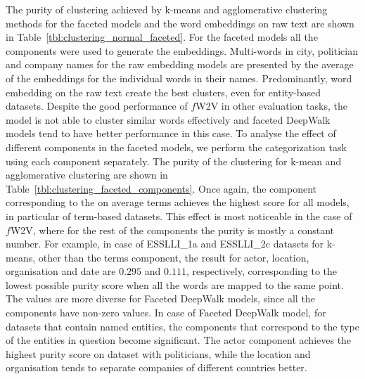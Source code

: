 The purity of clustering achieved by k-means and agglomerative clustering methods for the faceted models and the word embeddings on raw text are shown in Table~\ref{tbl:clustering_normal_faceted}. For the faceted models all the components were used to generate the embeddings. Multi-words in city, politician and company names for the raw embedding models are presented by the average of the embeddings for the individual words in their names. Predominantly, word embedding on the raw text create the best clusters, even for entity-based datasets. Despite the good performance of $f$W2V in other evaluation tasks, the model is not able to cluster similar words effectively and faceted DeepWalk models tend to have better performance in this case. To analyse the effect of different components in the faceted models, we perform the categorization task using each component separately. The purity of the clustering for k-mean and agglomerative clustering are shown in Table~\ref{tbl:clustering_faceted_components}. Once again, the component corresponding to the on average terms achieves the highest score for all models, in particular of term-based datasets. This effect is most noticeable in the case of $f$W2V, where for the rest of the components the purity is mostly a constant number. For example, in case of ESSLLI\_1a and ESSLLI\_2c datasets for k-means, other than the terms component, the result for actor, location, organisation and date are $0.295$ and $0.111$, respectively, corresponding to the lowest possible purity score when all the words are mapped to the same point. The values are more diverse for Faceted DeepWalk models, since all the components have non-zero values. In case of Faceted DeepWalk model, for datasets that contain named entities, the components that correspond to the type of the entities in question become significant. The actor component achieves the highest purity score on dataset with politicians, while the location and organisation tends to separate companies of different countries better. 
